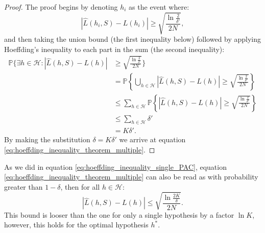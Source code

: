 \begin{proof}
  The proof begins by denoting $h_i$ as the event where: 
  \begin{equation*}
    \left| \hat{L}(h_i, S) - L(h_i) \right| \geq \sqrt{\frac{\ln \frac{2}{\delta'}}{2N}},
  \end{equation*}
   and then taking the union bound (the first inequality below) followed by applying Hoeffding's inequality to each part in the sum (the second inequality): 
\begin{equation*}
  \begin{split}
    \mathbb{P} \Biggl\{ \exists h \in \mathcal{H}: \left| \hat{L}(h, S) - L(h) \right| &\geq \sqrt{\frac{\ln \frac{2}{\delta'}}{2N}}  \Biggr\} \\
    &= \mathbb{P} \left\{ \bigcup_{h \in \mathcal{H}} \left| \hat{L}(h, S) - L(h) \right| \geq \sqrt{\frac{\ln \frac{2}{\delta'}}{2N}}  \right\}  \\
    &\leq \sum_{h \in \mathcal{H}} \mathbb{P} \left\{\left| \hat{L}(h, S) - L(h) \right| \geq \sqrt{\frac{\ln \frac{2}{\delta'}}{2N}} \right\}  \\
    &\leq \sum_{h \in \mathcal{H}} \delta' \\
    &= K \delta'.
  \end{split}
\end{equation*}
By making the substitution $\delta = K \delta'$ we arrive at equation \eqref{eq:hoeffding_inequality_theorem_multiple}. 
\end{proof}

As we did in equation \eqref{eq:hoeffding_inequality_single_PAC}, equation \eqref{eq:hoeffding_inequality_theorem_multiple} can also be read as with probability greater than $1-\delta$, then for all $h\in\mathcal{H}$:
\begin{equation}
  \label{eq:hoeffding_inequality_multi_PAC}
  \left| \hat{L}(h, S) - L(h) \right| \leq \sqrt{\frac{\ln \frac{2K}{\delta}}{2N}}.
\end{equation}
This bound is looser than the one for only a single hypothesis by a factor $\ln K$, however, this holds for the optimal hypothesis $h^*$. 


